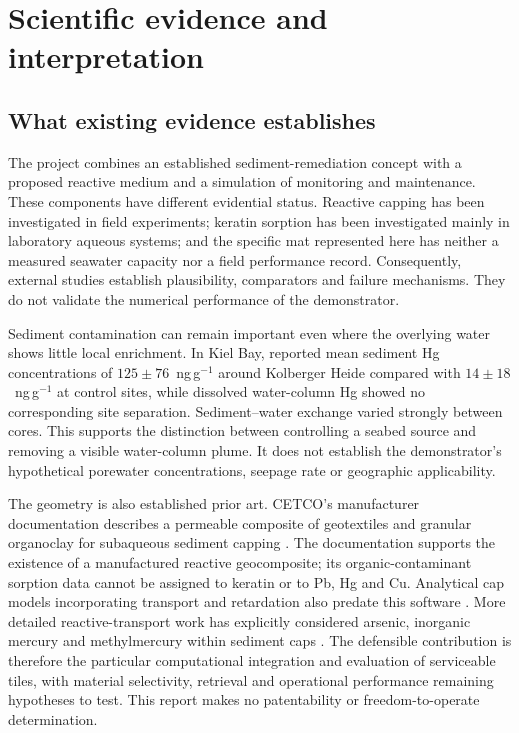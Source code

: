 \section{Scientific evidence and interpretation}
\label{sec:evidence}

\subsection{What existing evidence establishes}

The project combines an established sediment-remediation concept with a proposed reactive medium and a simulation of monitoring and maintenance. These components have different evidential status. Reactive capping has been investigated in field experiments; keratin sorption has been investigated mainly in laboratory aqueous systems; and the specific mat represented here has neither a measured seawater capacity nor a field performance record. Consequently, external studies establish plausibility, comparators and failure mechanisms. They do not validate the numerical performance of the demonstrator.

Sediment contamination can remain important even where the overlying water shows little local enrichment. In Kiel Bay, \citet{gosnell2023} reported mean sediment Hg concentrations of $125\pm76$~ng\,g$^{-1}$ around Kolberger Heide compared with $14\pm18$~ng\,g$^{-1}$ at control sites, while dissolved water-column Hg showed no corresponding site separation. Sediment--water exchange varied strongly between cores. This supports the distinction between controlling a seabed source and removing a visible water-column plume. It does not establish the demonstrator's hypothetical porewater concentrations, seepage rate or geographic applicability.

The geometry is also established prior art. CETCO's manufacturer documentation describes a permeable composite of geotextiles and granular organoclay for subaqueous sediment capping \citep{cetco2017}. The documentation supports the existence of a manufactured reactive geocomposite; its organic-contaminant sorption data cannot be assigned to keratin or to Pb, Hg and Cu. Analytical cap models incorporating transport and retardation also predate this software \citep{lampert2009}. More detailed reactive-transport work has explicitly considered arsenic, inorganic mercury and methylmercury within sediment caps \citep{bessinger2012}. The defensible contribution is therefore the particular computational integration and evaluation of serviceable tiles, with material selectivity, retrieval and operational performance remaining hypotheses to test. This report makes no patentability or freedom-to-operate determination.


